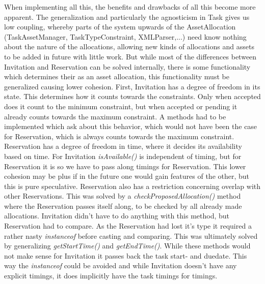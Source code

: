 				When implementing all this, the benefits and drawbacks of all this become more apparent. The generalization and particularly the agnosticism in Task gives us low coupling, whereby parts of the system upwards of the AssetAllocation (TaskAssetManager, TaskTypeConstraint, XMLParser,...) need know nothing about the nature of the allocations, allowing new kinds of allocations and assets to be added in future with little work. But while most of the differences between Invitation and Reservation can be solved internally, there is some functionality which determines their as an asset allocation, this functionality must be generalized causing lower cohesion. First, Invitation has a degree of freedom in its state. This determines how it counts towards the constraints. Only when accepted does it count to the minimum constraint, but when accepted or pending it already counts towards the maximum constraint. A methods had to be implemented which ask about this behavior, which would not have been the case for Reservation, which is always counts towards the maximum constraint. Reservation has a degree of freedom in time, where it decides its availability based on time. For Invitation \emph{isAvailable()} is independent of timing, but for Reservation it is so we have to pass along timings for Reservation. This lower cohesion may be plus if in the future one would gain features of the other, but this is pure speculative. Reservation also has a restriction concerning overlap with other Reservations. This was solved by a \emph{checkProposedAllocation()} method where the Reservation passes itself along, to be checked by all already made allocations. Invitation didn't have to do anything with this method, but Reservation had to compare. As the Reservation had lost it's type it required a rather nasty \emph{instanceof} before casting and comparing. This was ultimately solved by generalizing \emph{getStartTime()} and \emph{getEndTime()}. While these methods would not make sense for Invitation it passes back the task start- and duedate. This way the \emph{instanceof} could be avoided and while Invitation doesn't have any explicit timings, it does implicitly have the task timings for timings. 


